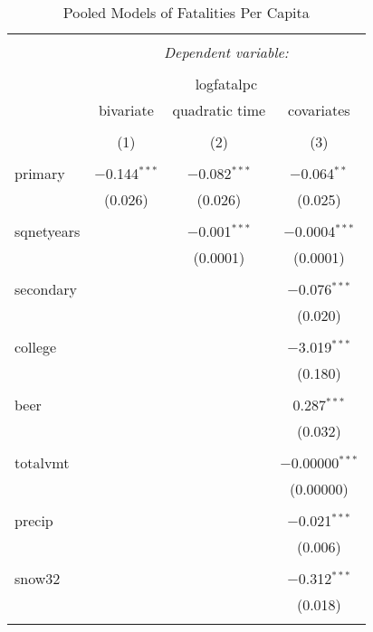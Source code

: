 \documentclass{article}
\begin{document}
\begin{table}[!htbp] \centering 
  \caption{Pooled Models of Fatalities Per Capita} 
  \label{} 
\footnotesize 
\begin{tabular}{@{\extracolsep{5pt}}lccc} 
\\[-1.8ex]\hline 
\hline \\[-1.8ex] 
 & \multicolumn{3}{c}{\textit{Dependent variable:}} \\ 
\cline{2-4} 
\\[-1.8ex] & \multicolumn{3}{c}{logfatalpc} \\ 
 & bivariate & quadratic time & covariates \\ 
\\[-1.8ex] & (1) & (2) & (3)\\ 
\hline \\[-1.8ex] 
 primary & $-$0.144$^{***}$ & $-$0.082$^{***}$ & $-$0.064$^{**}$ \\ 
  & (0.026) & (0.026) & (0.025) \\ 
  & & & \\ 
 sqnetyears &  & $-$0.001$^{***}$ & $-$0.0004$^{***}$ \\ 
  &  & (0.0001) & (0.0001) \\ 
  & & & \\ 
 secondary &  &  & $-$0.076$^{***}$ \\ 
  &  &  & (0.020) \\ 
  & & & \\ 
 college &  &  & $-$3.019$^{***}$ \\ 
  &  &  & (0.180) \\ 
  & & & \\ 
 beer &  &  & 0.287$^{***}$ \\ 
  &  &  & (0.032) \\ 
  & & & \\ 
 totalvmt &  &  & $-$0.00000$^{***}$ \\ 
  &  &  & (0.00000) \\ 
  & & & \\ 
 precip &  &  & $-$0.021$^{***}$ \\ 
  &  &  & (0.006) \\ 
  & & & \\ 
 snow32 &  &  & $-$0.312$^{***}$ \\ 
  &  &  & (0.018) \\ 
  & & & \\ 

\end{tabular}
\end{table}
\end{document}
